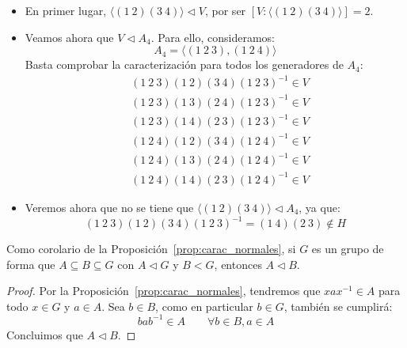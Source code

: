 \begin{ejemplo}
\begin{enumerate}
\begin{figure}[H]
            \end{figure}
            \begin{itemize}
                \item En primer lugar, $\langle (1\ 2)(3\ 4) \rangle \lhd V $, por ser $[V:\langle (1\ 2)(3\ 4) \rangle ] = 2$.
                \item Veamos ahora que $V\lhd A_4$. Para ello, consideramos:
                    \begin{equation*}
                        A_4 = \langle (1\ 2\ 3), (1\ 2\ 4) \rangle 
                    \end{equation*}
                    Basta comprobar la caracterización para todos los generadores de $A_4$:
                    \begin{align*}
                        &(1\ 2\ 3)(1\ 2)(3\ 4){(1\ 2\ 3)}^{-1} \in  V \\
                        &(1\ 2\ 3)(1\ 3)(2\ 4){(1\ 2\ 3)}^{-1} \in  V \\
                        &(1\ 2\ 3)(1\ 4)(2\ 3){(1\ 2\ 3)}^{-1} \in  V \\
                        &(1\ 2\ 4)(1\ 2)(3\ 4){(1\ 2\ 4)}^{-1} \in  V \\
                        &(1\ 2\ 4)(1\ 3)(2\ 4){(1\ 2\ 4)}^{-1} \in  V \\
                        &(1\ 2\ 4)(1\ 4)(2\ 3){(1\ 2\ 4)}^{-1} \in  V 
                    \end{align*}
                \item Veremos ahora que no se tiene que $\langle (1\ 2)(3\ 4) \rangle\lhd A_4 $, ya que:
                    \begin{equation*}
                        (1\ 2\ 3)(1\ 2)(3\ 4){(1\ 2\ 3)}^{-1} = (1\ 4)(2\ 3)\notin H
                    \end{equation*}
            \end{itemize}
    \end{enumerate}
\end{ejemplo}

\begin{coro}\label{coro:trans_normales}
    Como corolario de la Proposición~\ref{prop:carac_normales}, si $G$ es un grupo de forma que $A\subseteq B\subseteq G$ con $A\lhd G$ y $B < G$, entonces $A \lhd B$.
    \begin{proof}
        Por la Proposición~\ref{prop:carac_normales}, tendremos que $xax^{-1}\in A$ para todo $x\in G$ y $a\in A$. Sea $b\in B$, como en particular $b\in G$, también se cumplirá:
        \begin{equation*}
            bab^{-1}\in A \qquad \forall b\in B, a\in A
        \end{equation*}
        Concluimos que $A\lhd B$.
    \end{proof}
\end{coro}

